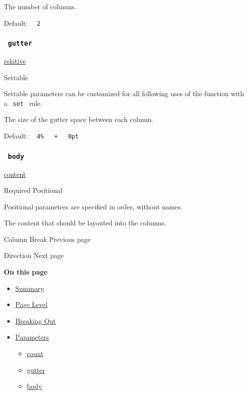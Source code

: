 The number of columns.

Default: \texttt{\ }{\texttt{\ 2\ }}\texttt{\ }

\subsubsection{\texorpdfstring{\texttt{\ gutter\ }}{ gutter }}\label{parameters-gutter}

\href{/docs/reference/layout/relative/}{relative}

{{ Settable }}

\label{parameters-gutter-settable-tooltip}
Settable parameters can be customized for all following uses of the
function with a \texttt{\ set\ } rule.

The size of the gutter space between each column.

Default:
\texttt{\ }{\texttt{\ 4\%\ }}\texttt{\ }{\texttt{\ +\ }}\texttt{\ }{\texttt{\ 0pt\ }}\texttt{\ }

\subsubsection{\texorpdfstring{\texttt{\ body\ }}{ body }}\label{parameters-body}

\href{/docs/reference/foundations/content/}{content}

{Required} {{ Positional }}

\label{parameters-body-positional-tooltip}
Positional parameters are specified in order, without names.

The content that should be layouted into the columns.

\href{/docs/reference/layout/colbreak/}{\pandocbounded{}}

{ Column Break } { Previous page }

\href{/docs/reference/layout/direction/}{\pandocbounded{}}

{ Direction } { Next page }

\textbf{On this page}

\begin{itemize}
\tightlist
\item
  \hyperref[summary]{Summary}
\item
  \hyperref[page-level]{Page Level}
\item
  \hyperref[breaking-out]{Breaking Out}
\item
  \hyperref[parameters]{Parameters}

  \begin{itemize}
  \tightlist
  \item
    \hyperref[parameters-count]{count}
  \item
    \hyperref[parameters-gutter]{gutter}
  \item
    \hyperref[parameters-body]{body}
  \end{itemize}
\end{itemize}

